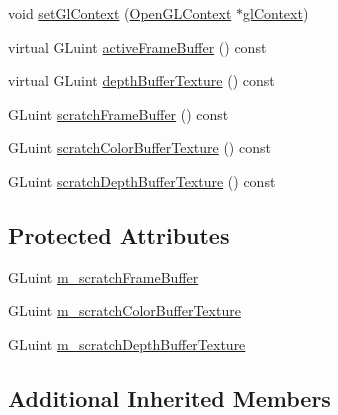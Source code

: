 \begin{DoxyCompactItemize}
\item 
void \hyperlink{classmotorcar_1_1Display_a487018838d0ecfa96011a5ae5caa2e91}{set\-Gl\-Context} (\hyperlink{classmotorcar_1_1OpenGLContext}{Open\-G\-L\-Context} $\ast$\hyperlink{classmotorcar_1_1Display_a884dd0b78dbecee82a33eb6d26a2a403}{gl\-Context})
\item 
virtual G\-Luint \hyperlink{classmotorcar_1_1Display_a7318ea219f098a3a8b412dcec0745334}{active\-Frame\-Buffer} () const 
\item 
virtual G\-Luint \hyperlink{classmotorcar_1_1Display_a90c69af93ca9d9fff26839fce0e90d53}{depth\-Buffer\-Texture} () const 
\item 
G\-Luint \hyperlink{classmotorcar_1_1Display_ae3d75dd51cb2339bd06905635def61e3}{scratch\-Frame\-Buffer} () const 
\item 
G\-Luint \hyperlink{classmotorcar_1_1Display_a7feeb01b24470cacaee200fa944e24df}{scratch\-Color\-Buffer\-Texture} () const 
\item 
G\-Luint \hyperlink{classmotorcar_1_1Display_ad0b25afba9811f1e85bdf6e4fdc9ff74}{scratch\-Depth\-Buffer\-Texture} () const 
\end{DoxyCompactItemize}
\subsection*{Protected Attributes}
\begin{DoxyCompactItemize}
\item 
G\-Luint \hyperlink{classmotorcar_1_1Display_a23f2535f375102eda1ba2cba2b2a03a4}{m\-\_\-scratch\-Frame\-Buffer}
\item 
G\-Luint \hyperlink{classmotorcar_1_1Display_a8948636502d6498b53fbb644a9064390}{m\-\_\-scratch\-Color\-Buffer\-Texture}
\item 
G\-Luint \hyperlink{classmotorcar_1_1Display_a32e11a89219cf0727cd85b19a30f21a6}{m\-\_\-scratch\-Depth\-Buffer\-Texture}
\end{DoxyCompactItemize}
\subsection*{Additional Inherited Members}


